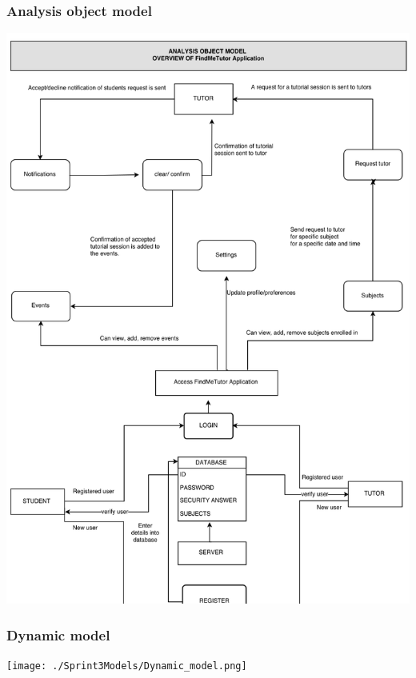 \documentclass[12pt]{article}
\begin{document}
\subsubsection{Analysis object model}
\includegraphics[width=140mm]{./Sprint3Models/Analysis_Object_model3.png}



\subsubsection{Dynamic model}
\texttt{[image: ./Sprint3Models/Dynamic\_model.png]}
\end{document}
